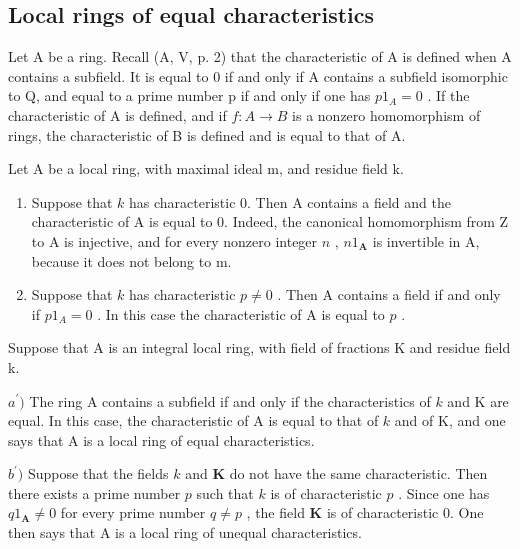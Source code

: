 \subsection{Local rings of equal characteristics}

Let A be a ring. Recall (A, V, p. 2) that the characteristic of A is defined when A contains a subfield. It is equal to 0 if and only if A contains a subfield isomorphic to Q, and equal to a prime number p if and only if one has \(p1_{A} = 0\) . If the characteristic of A is defined, and if \(f: A \to B\) is a nonzero homomorphism of rings, the characteristic of B is defined and is equal to that of A.

Let A be a local ring, with maximal ideal m, and residue field k.

\begin{enumerate}
\def\labelenumi{\alph{enumi})}
\item
  Suppose that \(k\) has characteristic 0. Then A contains a field and the characteristic of A is equal to 0. Indeed, the canonical homomorphism from Z to A is injective, and for every nonzero integer \(n\) , \(n1_{\mathbf{A}}\) is invertible in A, because it does not belong to m.
\item
  Suppose that \(k\) has characteristic \(p \neq 0\) . Then A contains a field if and only if \(p1_{A} = 0\) . In this case the characteristic of A is equal to \(p\) .
\end{enumerate}

Suppose that A is an integral local ring, with field of fractions K and residue field k.

\(a^{\prime})\) The ring A contains a subfield if and only if the characteristics of \(k\) and K are equal. In this case, the characteristic of A is equal to that of \(k\) and of K, and one says that A is a local ring of equal characteristics.

\(b^{\prime})\) Suppose that the fields \(k\) and \(\mathbf{K}\) do not have the same characteristic. Then there exists a prime number \(p\) such that \(k\) is of characteristic \(p\) . Since one has \(q1_{\mathbf{A}} \neq 0\) for every prime number \(q \neq p\) , the field \(\mathbf{K}\) is of characteristic 0. One then says that A is a local ring of unequal characteristics.

